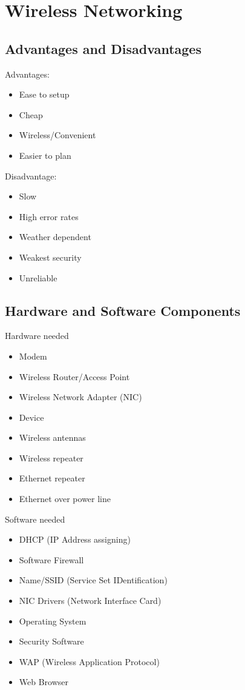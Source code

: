 \documentclass[../notes.tex]{subfiles}
\begin{document}
\section{Wireless Networking}

\subsection{Advantages and Disadvantages}
Advantages: 
\begin{itemize}
	\item Ease to setup
	\item Cheap
	\item Wireless/Convenient
	\item Easier to plan
\end{itemize}

Disadvantage:
\begin{itemize}
	\item Slow
	\item High error rates
	\item Weather dependent
	\item Weakest security
	\item Unreliable
\end{itemize}

\subsection{Hardware and Software Components}
Hardware needed
\begin{itemize}
	\item Modem 
	\item Wireless Router/Access Point
	\item Wireless Network Adapter (NIC)
	\item Device
	\item Wireless antennas
	\item Wireless repeater
	\item Ethernet repeater
	\item Ethernet over power line
\end{itemize}

Software needed
\begin{itemize}
	\item DHCP (IP Address assigning)
	\item Software Firewall
	\item Name/SSID (Service Set IDentification)
	\item NIC Drivers (Network Interface Card)
	\item Operating System
	\item Security Software
	\item WAP (Wireless Application Protocol)
	\item Web Browser
\end{itemize}
\end{document}
